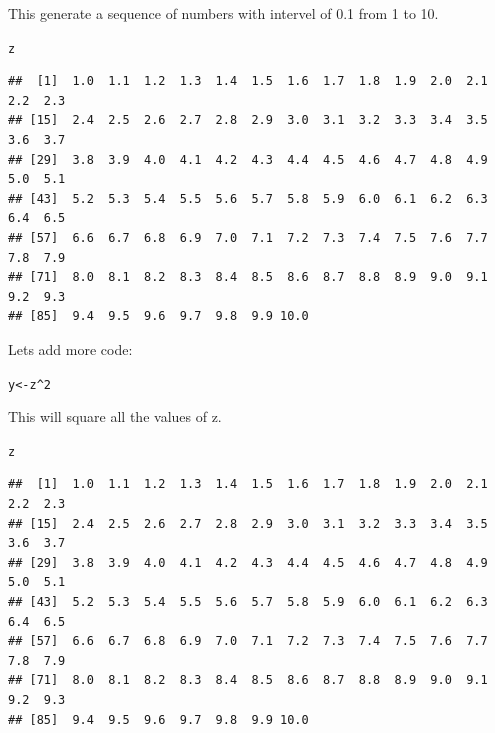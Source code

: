 \documentclass{article}\usepackage[]{graphicx}\usepackage[]{color}
\makeatletter
\newcommand{\hlnum}[1]{\textcolor[rgb]{0.686,0.059,0.569}{#1}}%
\newcommand{\hlopt}[1]{\textcolor[rgb]{0,0,0}{#1}}%
\newcommand{\hlstd}[1]{\textcolor[rgb]{0.345,0.345,0.345}{#1}}%
\newcommand{\hlkwb}[1]{\textcolor[rgb]{0.69,0.353,0.396}{#1}}%
\newenvironment{kframe}{%
 \def\at@end@of@kframe{}%
 \ifinner\ifhmode%
  \def\at@end@of@kframe{\end{minipage}}%
  \begin{minipage}{\columnwidth}%
 \fi\fi%
 \def\FrameCommand##1{\hskip\@totalleftmargin \hskip-\fboxsep
 \colorbox{shadecolor}{##1}\hskip-\fboxsep
     \hskip-\linewidth \hskip-\@totalleftmargin \hskip\columnwidth}%
 \MakeFramed {\advance\hsize-\width
   \@totalleftmargin\z@ \linewidth\hsize
   \@setminipage}}%
 {\par\unskip\endMakeFramed%
 \at@end@of@kframe}
\newenvironment{knitrout}{}{} %
\makeatother
\begin{document}
\noindent This generate a sequence of numbers with intervel of 0.1 from 1 to 10.
\begin{knitrout}
\color{fgcolor}\begin{kframe}
\begin{alltt}
\hlstd{z}
\end{alltt}
\begin{verbatim}
##  [1]  1.0  1.1  1.2  1.3  1.4  1.5  1.6  1.7  1.8  1.9  2.0  2.1  2.2  2.3
## [15]  2.4  2.5  2.6  2.7  2.8  2.9  3.0  3.1  3.2  3.3  3.4  3.5  3.6  3.7
## [29]  3.8  3.9  4.0  4.1  4.2  4.3  4.4  4.5  4.6  4.7  4.8  4.9  5.0  5.1
## [43]  5.2  5.3  5.4  5.5  5.6  5.7  5.8  5.9  6.0  6.1  6.2  6.3  6.4  6.5
## [57]  6.6  6.7  6.8  6.9  7.0  7.1  7.2  7.3  7.4  7.5  7.6  7.7  7.8  7.9
## [71]  8.0  8.1  8.2  8.3  8.4  8.5  8.6  8.7  8.8  8.9  9.0  9.1  9.2  9.3
## [85]  9.4  9.5  9.6  9.7  9.8  9.9 10.0
\end{verbatim}
\end{kframe}
\end{knitrout}

\noindent Lets add more code:
\begin{knitrout}
\color{fgcolor}\begin{kframe}
\begin{alltt}
\hlstd{y}\hlkwb{<-}\hlstd{z}\hlopt{^}\hlnum{2}
\end{alltt}
\end{kframe}
\end{knitrout}

\noindent This will square all the values of z.
\begin{knitrout}
\color{fgcolor}\begin{kframe}
\begin{alltt}
\hlstd{z}
\end{alltt}
\begin{verbatim}
##  [1]  1.0  1.1  1.2  1.3  1.4  1.5  1.6  1.7  1.8  1.9  2.0  2.1  2.2  2.3
## [15]  2.4  2.5  2.6  2.7  2.8  2.9  3.0  3.1  3.2  3.3  3.4  3.5  3.6  3.7
## [29]  3.8  3.9  4.0  4.1  4.2  4.3  4.4  4.5  4.6  4.7  4.8  4.9  5.0  5.1
## [43]  5.2  5.3  5.4  5.5  5.6  5.7  5.8  5.9  6.0  6.1  6.2  6.3  6.4  6.5
## [57]  6.6  6.7  6.8  6.9  7.0  7.1  7.2  7.3  7.4  7.5  7.6  7.7  7.8  7.9
## [71]  8.0  8.1  8.2  8.3  8.4  8.5  8.6  8.7  8.8  8.9  9.0  9.1  9.2  9.3
## [85]  9.4  9.5  9.6  9.7  9.8  9.9 10.0
\end{verbatim}
\end{kframe}
\end{knitrout}
\end{document}
